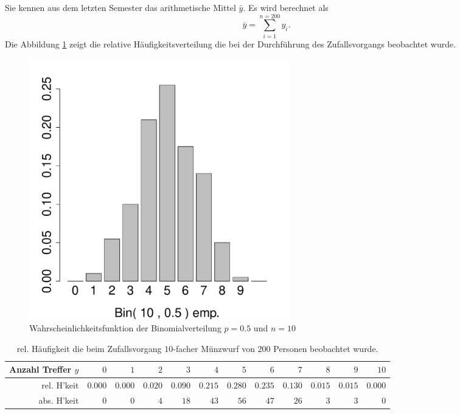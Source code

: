 \documentclass[11pt]{article}
\begin{document}
\begin{enumerate}
Sie kennen aus dem letzten Semester das arithmetische Mittel $\bar{y}.$ Es wird berechnet als
\begin{equation*}
\bar{y} = \sum_{i=1}^{n=200} y_{i}.
\end{equation*}
Die Abbildung \ref{abb2} zeigt die relative Häufigkeitsverteilung die bei der Durchführung des Zufallsvorgangs beobachtet wurde.
 \begin{figure}[ht]
 	\centering
 	      \includegraphics[width=0.55\textwidth]{muenzeEmp.pdf}
 	      \caption{Wahrscheinlichkeitsfunktion der Binomialverteilung $p=0.5$ und $n=10$
 	       \label{abb2}}
 	\end{figure}
 	
 	\begin{table}[h]
 	 \centering 
 \small %
\begin{tabular}{|r|r|r|r|r|r|r|r|r|r|r|r|}
  \hline
   Anzahl Treffer  $y$                               & $0$    &   $1$    & $2$   & $3$   & $4$   & $5$ &   $6$    & $7$   & $8$   & $9$   & $10$\\ \hline
   rel. H'keit & $0.000$ & $0.000$ & $0.020$ & $0.090$ & $0.215$ & $0.280$ & $0.235$ & $0.130$ & $0.015$ & $0.015$ & $0.000$  \\ \hline
    abs. H'keit & $0$ & $0$ & $4$ & $18$ & $43$ & $56$ & $47$ & $26$ & $3$ & $3$ & $0$  \\ \hline
\end{tabular}
 \caption{rel. Häufigkeit die beim Zufallsvorgang $10$-facher Münzwurf von $200$ Personen beobachtet wurde. \label{tab2}}
 \end{table}  



\end{enumerate}
\end{document}

